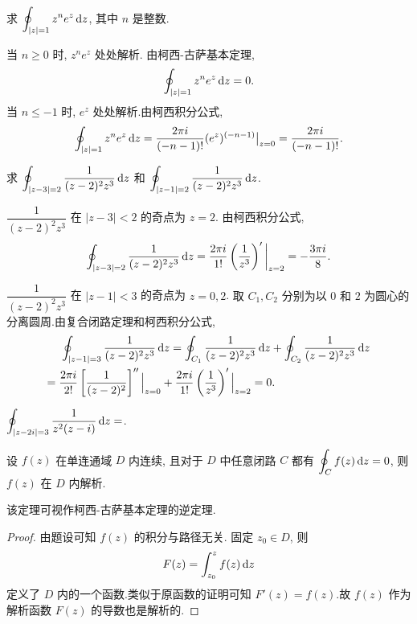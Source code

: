 \begin{example}
	求 $\displaystyle\oint_{|z|=1}z^ne^z\,\mathrm{d} z$, 其中 $n$ 是整数.
\end{example}

\begin{solution}
	当 $n\ge 0$ 时, $z^ne^z$ 处处解析.
	{由柯西-古萨基本定理, 
		\[\oint_{|z|=1}z^ne^z\,\mathrm{d} z=0.\]当 $n\le-1$ 时, $e^z$ 处处解析.由柯西积分公式,
		\[\oint_{|z|=1}z^ne^z\,\mathrm{d} z
		=\frac{2\pi i}{(-n-1)!}(e^z)^{(-n-1)}\big|_{z=0}
		=\frac{2\pi i}{(-n-1)!}.\]}
\end{solution}

\begin{example}
	求 $\displaystyle\oint_{|z-3|=2}\frac1{(z-2)^2z^3}\,\mathrm{d} z$ 和 $\displaystyle\oint_{|z-1|=2}\frac1{(z-2)^2z^3}\,\mathrm{d} z$.
\end{example}

\begin{solution}
	 $\dfrac1{(z-2)^2z^3}$ 在 $|z-3|<2$ 的奇点为 $z=2$.
	{由柯西积分公式,
		\[\oint_{|z-3|=2}\frac1{(z-2)^2z^3}\,\mathrm{d} z
		=\frac{2\pi i}{1!}\left(\frac1{z^3}\right)'\bigg|_{z=2}
		=-\frac{3\pi i}8.\]}

	 $\dfrac1{(z-2)^2z^3}$ 在 $|z-1|<3$ 的奇点为 $z=0,2$.
	{取 $C_1,C_2$ 分别为以 $0$ 和 $2$ 为圆心的分离圆周.由复合闭路定理和柯西积分公式,
		\begin{align*}
		&\peq\oint_{|z-1|=3}\frac1{(z-2)^2z^3}\diff z=\oint_{C_1}\frac1{(z-2)^2z^3}\diff z+\oint_{C_2}\frac1{(z-2)^2z^3}\diff z\\
		&{=\frac{2\pi i}{2!}\left[\frac1{(z-2)^2}\right]''\Big|_{z=0}+\frac{2\pi i}{1!}\left(\frac1{z^3}\right)'\Big|_{z=2}=0.}
		\end{align*}}
\end{solution}

\begin{exercise}
	$\displaystyle\oint_{|z-2i|=3}\frac1{z^2(z-i)}\,\mathrm{d} z=$.
\end{exercise}

\begin{example}[莫累拉定理]
	设 $f(z)$ 在单连通域 $D$ 内连续, 且对于 $D$ 中任意闭路 $C$ 都有 $\displaystyle\oint_Cf(z)\,\mathrm{d} z=0$, 则 $f(z)$ 在 $D$ 内解析.
\end{example}

该定理可视作柯西-古萨基本定理的逆定理.

\begin{proof}
	由题设可知 $f(z)$ 的积分与路径无关.
	{固定 $z_0\in D$, 则
		\[F(z)=\int_{z_0}^zf(z)\,\mathrm{d} z\]
	定义了 $D$ 内的一个函数.类似于原函数的证明可知 $F'(z)=f(z)$.故 $f(z)$ 作为解析函数 $F(z)$ 的导数也是解析的.\qedhere}
\end{proof}

